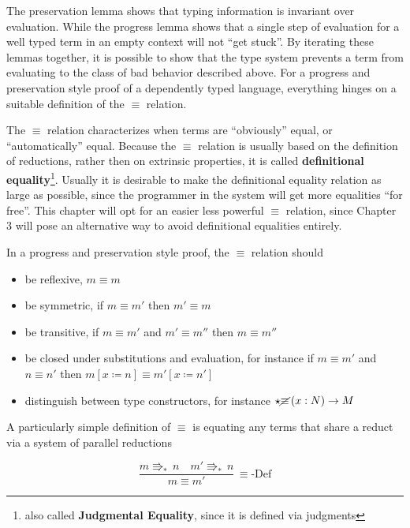 The preservation lemma shows that typing information is invariant over evaluation.
While the progress lemma shows that a single step of evaluation for a well typed term in an empty context will not ``get stuck''.
By iterating these lemmas together, it is possible to show that the type system prevents a term from evaluating to the class of bad behavior described above.
For a progress and preservation style proof of a dependently typed language, everything hinges on a suitable definition of the $\equiv$ relation.

The $\equiv$ relation characterizes when terms are ``obviously'' equal, or ``automatically'' equal.
Because the $\equiv$ relation is usually based on the definition of reductions, rather then on extrinsic properties, it is called \textbf{definitional equality}\footnote{also called \textbf{Judgmental Equality}, since it is defined via judgments}.
Usually it is desirable to make the definitional equality relation as large as possible, since the programmer in the system will get more equalities ``for free''.
This chapter will opt for an easier less powerful $\equiv$ relation, since Chapter 3 will pose an alternative way to avoid definitional equalities entirely.

In a progress and preservation style proof, the $\equiv$ relation should 

\begin{itemize}
\item be reflexive, $m\equiv m$ 
\item be symmetric, if $m\equiv m'$ then $m'\equiv m$ 
\item be transitive, if $m\equiv m'$ and $m'\equiv m''$ then $m\equiv m''$ 
\item be closed under substitutions and evaluation, for instance if $m\equiv m'$ and $n\equiv n'$ then $m\left[x\coloneqq n\right]\equiv m'\left[x\coloneqq n'\right]$ 
\item distinguish between type constructors, for instance $\star\cancel{\equiv}\left(x:N\right)\rightarrow M$ 
\end{itemize}
A particularly simple definition of $\equiv$ is equating any terms that share a reduct via a system of parallel reductions

\[
\frac{m\Rrightarrow_{\ast}\,n\quad m'\Rrightarrow_{\ast}\,n}{m\equiv m'}\,\equiv\textrm{-Def}
\]

